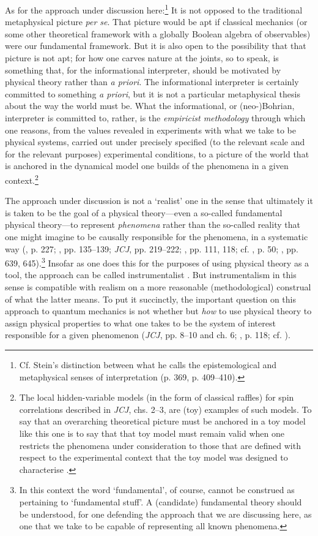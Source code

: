\documentclass[12pt,english,twoside]{article}
\numberwithin{equation}{section}
\begin{document}
As for the approach under discussion here:\footnote{Cf. Stein's \citeyearpar[]{stein1972} distinction between what he calls the epistemological and metaphysical senses of interpretation (p. 369, p. 409--410).} It is not opposed to the traditional metaphysical picture \emph{per se}. That picture would be apt if classical mechanics (or some other theoretical framework with a globally Boolean algebra of observables) were our fundamental framework. But it is also open to the possibility that that picture is not apt; for how one carves nature at the joints, so to speak, is something that, for the informational interpreter, should be motivated by physical theory rather than \emph{a priori}. The informational interpreter is certainly committed to something \emph{a priori}, but it is not a particular metaphysical thesis about the way the world must be. What the informational, or (neo-)Bohrian, interpreter is committed to, rather, is the \emph{empiricist methodology} through which one reasons, from the values revealed in experiments with what we take to be physical systems, carried out under precisely specified (to the relevant scale and for the relevant purposes) experimental conditions, to a picture of the world that is anchored in the dynamical model one builds of the phenomena in a given context.\footnote{The local hidden-variable models (in the form of classical raffles) for spin correlations described in \emph{JCJ}, chs. 2--3, are (toy) examples of such models. To say that an overarching theoretical picture must be anchored in a toy model like this one is to say that that toy model must remain valid when one restricts the phenomena under consideration to those that are defined with respect to the experimental context that the toy model was designed to characterise \citep[cf.][pt. 2]{perovic2021}.}

The approach under discussion is not a `realist' one in the sense that ultimately it is taken to be the goal of a physical theory---even a so-called fundamental physical theory---to represent \emph{phenomena} rather than the so-called reality that one might imagine to be causally responsible for the phenomena, in a systematic way (\citealt{bub2016}, p. 227; \citealt{demopoulosOnTheories}, pp. 135--139; \emph{JCJ}, pp. 219--222; \citealt{pitowsky1994}, pp. 111, 118; cf. \citealt{stein1989}, p. 50; \citealt{stein1994}, pp. 639, 645).\footnote{In this context the word `fundamental', of course, cannot be construed as pertaining to `fundamental stuff'. A (candidate) fundamental theory should be understood, for one defending the approach that we are discussing here, as one that we take to be capable of representing all known phenomena.} Insofar as one does this for the purposes of using physical theory as a tool, the approach can be called instrumentalist \citep[cf.][p. 2]{adlam2022}. But instrumentalism in this sense is compatible with realism on a more reasonable (methodological) construal of what the latter means. To put it succinctly, the important question on this approach to quantum mechanics is not whether but \emph{how} to use physical theory to assign physical properties to what one takes to be the system of interest responsible for a given phenomenon (\emph{JCJ}, pp. 8--10 and ch. 6; \citealt{perovic2021}, p. 118; cf. \citet[p. 371]{stein1972}).
\end{document}
